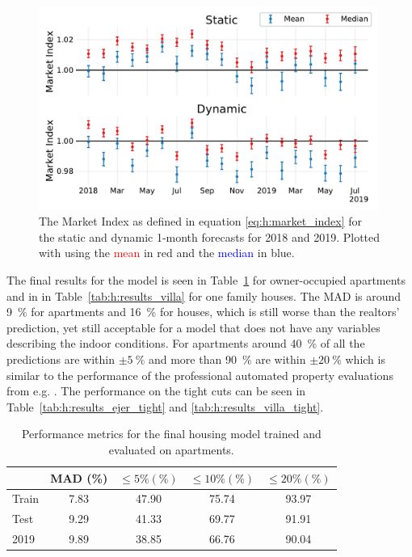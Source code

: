 \begin{figure}
  \centerfloat
  \includegraphics[width=0.99\textwidth, trim=10 15 10 10, clip]{figures/housing/Ejerlejlighed_v19_cut_all_Ncols_all_xgb_forecast_prediction_MarketIndex.pdf}
  \caption[Market Index based on the Static and Dynamic XGB Forecasts]
          {The Market Index as defined in equation \eqref{eq:h:market_index} for the static and dynamic 1-month forecasts for \num{2018} and \num{2019}. Plotted with using the \textcolor{red}{mean} in red and the \textcolor{blue}{median} in blue.} 
  \label{fig:h:forecast_MarketIndex}
\end{figure}

The final results for the model is seen in Table~\ref{tab:h:results_ejer} for owner-occupied apartments and in in Table~\ref{tab:h:results_villa} for one family houses. The MAD is around \SI{9}{\percent} for apartments and \SI{16}{\percent} for houses, which is still worse than the realtors' prediction, yet still acceptable for a model that does not have any variables describing the indoor conditions. For apartments around \SI{40}{\percent} of all the predictions are within $\pm \SI{5}{\percent}$ and more than \SI{90}{\percent} are within $\pm \SI{20}{\percent}$ which is similar to the performance of the professional automated property evaluations from e.g. \citet{bolighedBolighedUsikkerhedDatavurderingen}. The performance on the tight cuts can be seen in Table~\ref{tab:h:results_ejer_tight} and \ref{tab:h:results_villa_tight}. 


\begin{table}
  \centerfloat
  \begin{tabular}{@{}lcccc@{}}
    {} &      MAD (\%) & $\leq 5\% (\%)$ &  $\leq 10\% (\%)$ &   $\leq 20\% (\%)$   \\
    \midrule
    Train & \num{7.83} & \num{47.90} & \num{75.74} & \num{93.97} \\
    Test  & \num{9.29} & \num{41.33} & \num{69.77} & \num{91.91} \\
    2019  & \num{9.89} & \num{38.85} & \num{66.76} & \num{90.04}    
  \end{tabular}
  \vspace{\abovecaptionskip}
  \caption[Performance Metrics for the Housing Model on Apartments]{Performance metrics for the final housing model trained and evaluated on apartments.}
  \label{tab:h:results_ejer}
\end{table}


